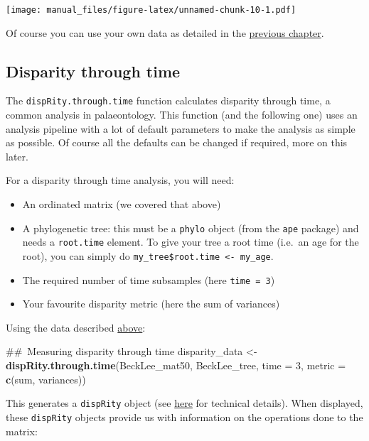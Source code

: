 \documentclass[]{book}
\newenvironment{Shaded}{\begin{snugshade}}{\end{snugshade}}
\newcommand{\KeywordTok}[1]{\textcolor[rgb]{0.13,0.29,0.53}{\textbf{#1}}}
\newcommand{\DataTypeTok}[1]{\textcolor[rgb]{0.13,0.29,0.53}{#1}}
\newcommand{\DecValTok}[1]{\textcolor[rgb]{0.00,0.00,0.81}{#1}}
\newcommand{\StringTok}[1]{\textcolor[rgb]{0.31,0.60,0.02}{#1}}
\newcommand{\NormalTok}[1]{#1}
\providecommand{\tightlist}{%
  \setlength{\itemsep}{0pt}\setlength{\parskip}{0pt}}
\theoremstyle{definition}
\theoremstyle{definition}
\theoremstyle{remark}
\begin{document}
\texttt{[image: manual\_files/figure-latex/unnamed-chunk-10-1.pdf]}

Of course you can use your own data as detailed in the
\protect\hyperlink{What-sort-of-data-does-dispRity-work-with}{previous
chapter}.

\subsection{Disparity through time}\label{disparity-through-time}

The \texttt{dispRity.through.time} function calculates disparity through
time, a common analysis in palaeontology. This function (and the
following one) uses an analysis pipeline with a lot of default
parameters to make the analysis as simple as possible. Of course all the
defaults can be changed if required, more on this later.

For a disparity through time analysis, you will need:

\begin{itemize}
\tightlist
\item
  An ordinated matrix (we covered that above)
\item
  A phylogenetic tree: this must be a \texttt{phylo} object (from the
  \texttt{ape} package) and needs a \texttt{root.time} element. To give
  your tree a root time (i.e.~an age for the root), you can simply do
  \texttt{my\_tree\$root.time\ \textless{}-\ my\_age}.
\item
  The required number of time subsamples (here \texttt{time\ =\ 3})
\item
  Your favourite disparity metric (here the sum of variances)
\end{itemize}

Using the \citet{beckancient2014} data described
\protect\hyperlink{example-data}{above}:

\begin{Shaded}
\begin{Highlighting}[]
\NormalTok{## Measuring disparity through time}
\NormalTok{disparity_data <-}\StringTok{ }\KeywordTok{dispRity.through.time}\NormalTok{(BeckLee_mat50, BeckLee_tree,}
                                        \DataTypeTok{time =} \DecValTok{3}\NormalTok{, }\DataTypeTok{metric =} \KeywordTok{c}\NormalTok{(sum, variances))}
\end{Highlighting}
\end{Shaded}

This generates a \texttt{dispRity} object (see
\protect\hyperlink{manipulating-dispRity-objects}{here} for technical
details). When displayed, these \texttt{dispRity} objects provide us
with information on the operations done to the matrix:
\end{document}
